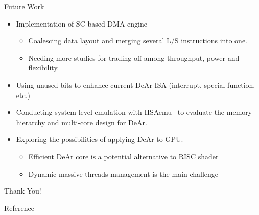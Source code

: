 \documentclass{beamer}
\begin{document}
\begin{CJK}{UTF8}{bkai}
    \begin{frame}{Future Work}
        \begin{itemize}
            \item Implementation of SC-based DMA engine~\cite{sc}
                \begin{itemize}
                    \item Coalescing data layout and merging several L/S instructions into one.
                    \item Needing more studies for trading-off among throughput, power and flexibility. 
                \end{itemize}
            \item Using unused bits to enhance current DeAr ISA (interrupt, special function, etc.)
            \item Conducting system level emulation with HSAemu~\cite{hsaemu} to evaluate the memory hierarchy and multi-core design for DeAr.
            \item Exploring the possibilities of applying DeAr to GPU.
                \begin{itemize}
                    \item Efficient DeAr core is a potential alternative to RISC shader
                    \item Dynamic massive threads management is the main challenge
                \end{itemize}
        \end{itemize}
    
    \end{frame}

    \begin{frame}[plain,c]
        \centering
        \Huge{Thank You!}
    \end{frame}

    \begin{frame}[allowframebreaks]{Reference}
        \printbibliography
    \end{frame}


\end{CJK}
\end{document}
